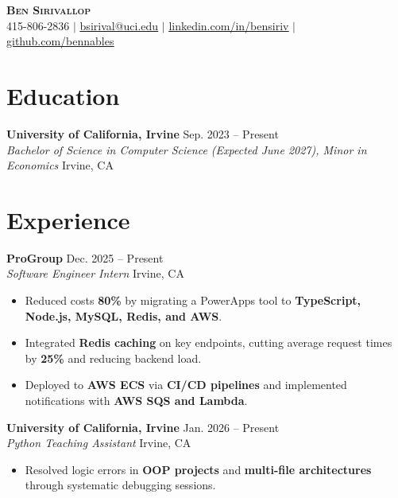 \documentclass[letterpaper,11pt]{article}
\renewcommand\ULdepth{1.8pt}
\begin{document}
\renewcommand{\ULdepth}{4pt}

\begin{center}
    \textbf{\Huge \scshape Ben Sirivallop} \\ \vspace{1pt}
    \small 415-806-2836 $|$ \href{mailto:bsirival@uci.edu}{\uline{bsirival@uci.edu}} $|$
\href{https://linkedin.com/in/bensiriv}{\uline{linkedin.com/in/bensiriv}} $|$
\href{https://github.com/bennables}{\uline{github.com/bennables}}
\end{center}

\section*{Education}
\textbf{University of California, Irvine} \hfill Sep. 2023 -- Present \\
\textit{Bachelor of Science in Computer Science (Expected June 2027), Minor in Economics} \hfill Irvine, CA

\section*{Experience}
\textbf{ProGroup} \hfill Dec. 2025 -- Present \\
\textit{Software Engineer Intern} \hfill Irvine, CA
\begin{itemize}
  \item Reduced costs \textbf{80\%} by migrating a PowerApps tool to \textbf{TypeScript, Node.js, MySQL, Redis, and AWS}.
  \item Integrated \textbf{Redis caching} on key endpoints, cutting average request times by \textbf{25\%} and reducing backend load.
  \item Deployed to \textbf{AWS ECS} via \textbf{CI/CD pipelines} and implemented notifications with \textbf{AWS SQS and Lambda}.
\end{itemize}

\textbf{University of California, Irvine} \hfill Jan. 2026 -- Present \\
\textit{Python Teaching Assistant} \hfill Irvine, CA
\begin{itemize}
  \item Resolved logic errors in \textbf{OOP projects} and \textbf{multi-file architectures} through systematic debugging sessions.
\end{itemize}
\end{document}
